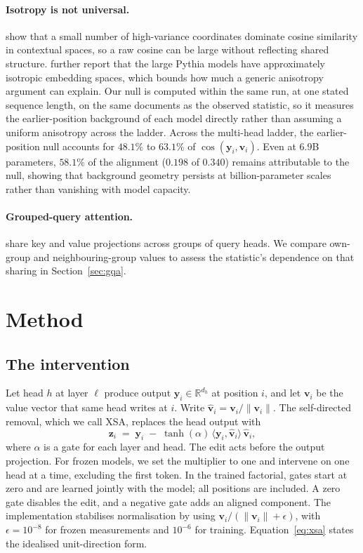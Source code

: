 \documentclass{article} %
\newcommand{\vhat}{\hat{\mathbf{v}}}
\newcommand{\yv}{\mathbf{y}}
\newcommand{\zv}{\mathbf{z}}
\begin{document}
\paragraph{Isotropy is not universal.} \citet{timkey2021bark} show that a
small number of high-variance coordinates dominate cosine similarity in
contextual spaces, so a raw cosine can be large without reflecting shared
structure. \citet{machina2024anisotropy} further report that the large Pythia
models have approximately isotropic embedding spaces, which bounds how much a
generic anisotropy argument can explain. Our null is computed within the same
run, at one stated sequence length, on the same documents as the observed
statistic, so it measures the earlier-position background of each model
directly rather than assuming a uniform anisotropy across the ladder. Across
the multi-head ladder, the earlier-position null accounts for $48.1\%$ to
$63.1\%$ of $\cos(\yv_i, \mathbf{v}_i)$. Even at $6.9$B parameters, $58.1\%$
of the alignment ($0.198$ of $0.340$) remains attributable to the null,
showing that background geometry persists at billion-parameter scales rather
than vanishing with model capacity.

\paragraph{Grouped-query attention.} \citet{ainslie2023gqa} share key and value
projections across groups of query heads. We compare own-group and
neighbouring-group values to assess the statistic's dependence on that sharing in
Section~\ref{sec:gqa}.

\section{Method}
\label{sec:method}

\subsection{The intervention}

Let head $h$ at layer $\ell$ produce output $\yv_i \in \mathbb{R}^{d_h}$ at
position $i$, and let $\mathbf{v}_i$ be the value vector that same head writes
at $i$. Write $\vhat_i = \mathbf{v}_i / \lVert \mathbf{v}_i \rVert$. The
self-directed removal, which we call XSA, replaces the head output with
%
\begin{equation}
\zv_i \;=\; \yv_i \;-\; \tanh(\alpha)\,\langle \yv_i, \vhat_i\rangle\,\vhat_i ,
\label{eq:xsa}
\end{equation}
%
where $\alpha$ is a gate for each layer and head. The edit acts before the
output projection. For frozen models, we set the multiplier to one and
intervene on one head at a time, excluding the first token. In the trained
factorial, gates start at zero and are learned jointly with the model; all
positions are included. A zero gate disables the edit, and a negative gate
adds an aligned component. The implementation stabilises normalisation by
using $\mathbf{v}_i/(\lVert\mathbf{v}_i\rVert+\epsilon)$, with
$\epsilon=10^{-8}$ for frozen measurements and $10^{-6}$ for training.
Equation~\ref{eq:xsa} states the idealised unit-direction form.
\end{document}
